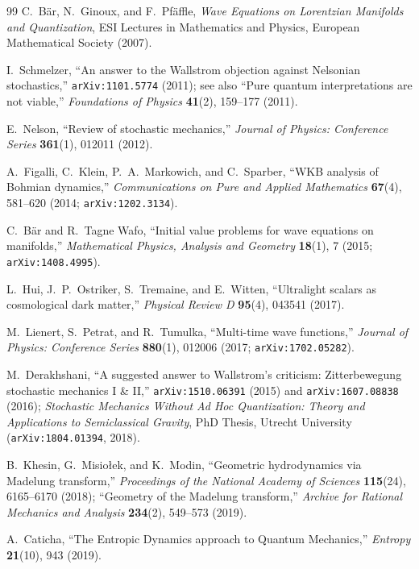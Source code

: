 \documentclass[11pt, a4paper]{article}
\theoremstyle{definition}
\begin{document}
\begin{thebibliography}{99}
C.~B\"{a}r, N.~Ginoux, and F.~Pf\"{a}ffle, \textit{Wave Equations on Lorentzian Manifolds and Quantization}, ESI Lectures in Mathematics and Physics, European Mathematical Society (2007).

I.~Schmelzer, ``An answer to the Wallstrom objection against Nelsonian stochastics,'' \texttt{arXiv:1101.5774} (2011); see also ``Pure quantum interpretations are not viable,'' \textit{Foundations of Physics} \textbf{41}(2), 159--177 (2011).

E.~Nelson, ``Review of stochastic mechanics,'' \textit{Journal of Physics: Conference Series} \textbf{361}(1), 012011 (2012).

A.~Figalli, C.~Klein, P.~A.~Markowich, and C.~Sparber, ``WKB analysis of Bohmian dynamics,'' \textit{Communications on Pure and Applied Mathematics} \textbf{67}(4), 581--620 (2014; \texttt{arXiv:1202.3134}).

C.~B\"{a}r and R.~Tagne Wafo, ``Initial value problems for wave equations on manifolds,'' \textit{Mathematical Physics, Analysis and Geometry} \textbf{18}(1), 7 (2015; \texttt{arXiv:1408.4995}).

L.~Hui, J.~P.~Ostriker, S.~Tremaine, and E.~Witten, ``Ultralight scalars as cosmological dark matter,'' \textit{Physical Review D} \textbf{95}(4), 043541 (2017).

M.~Lienert, S.~Petrat, and R.~Tumulka, ``Multi-time wave functions,'' \textit{Journal of Physics: Conference Series} \textbf{880}(1), 012006 (2017; \texttt{arXiv:1702.05282}).

M.~Derakhshani, ``A suggested answer to Wallstrom's criticism: Zitterbewegung stochastic mechanics I \& II,'' \texttt{arXiv:1510.06391} (2015) and \texttt{arXiv:1607.08838} (2016); \textit{Stochastic Mechanics Without Ad Hoc Quantization: Theory and Applications to Semiclassical Gravity}, PhD Thesis, Utrecht University (\texttt{arXiv:1804.01394}, 2018).

B.~Khesin, G.~Misio\l{}ek, and K.~Modin, ``Geometric hydrodynamics via Madelung transform,'' \textit{Proceedings of the National Academy of Sciences} \textbf{115}(24), 6165--6170 (2018); ``Geometry of the Madelung transform,'' \textit{Archive for Rational Mechanics and Analysis} \textbf{234}(2), 549--573 (2019).

A.~Caticha, ``The Entropic Dynamics approach to Quantum Mechanics,'' \textit{Entropy} \textbf{21}(10), 943 (2019).


\end{thebibliography}
\end{document}
